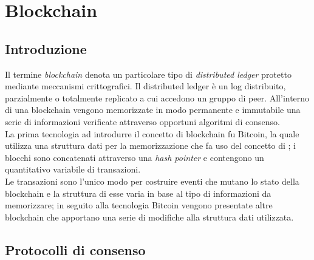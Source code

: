 \chapter{Blockchain}
\label{chap:blockchain}

\section{Introduzione}
\label{sec:introduzione}

Il termine \emph{blockchain} denota un particolare tipo di \emph{distributed ledger} protetto mediante meccanismi crittografici.
Il distributed ledger è un log distribuito, parzialmente o totalmente replicato a cui accedono un gruppo di peer.
All’interno di una blockchain vengono memorizzate in modo permanente e immutabile una serie di informazioni verificate attraverso opportuni algoritmi di consenso.\\
La prima tecnologia ad introdurre il concetto di blockchain fu Bitcoin, la quale utilizza una struttura dati per la memorizzazione che fa uso del concetto di ; i blocchi sono concatenati attraverso una \emph{hash pointer} e contengono un quantitativo variabile di transazioni.\\
Le transazioni sono l'unico modo per costruire eventi che mutano lo stato della blockchain e la struttura di esse varia in base al tipo di informazioni da memorizzare; in seguito alla tecnologia Bitcoin vengono presentate altre blockchain che apportano una serie di modifiche alla struttura dati utilizzata.


\section{Protocolli di consenso}
\label{sec:protocolloDiConsenso}

